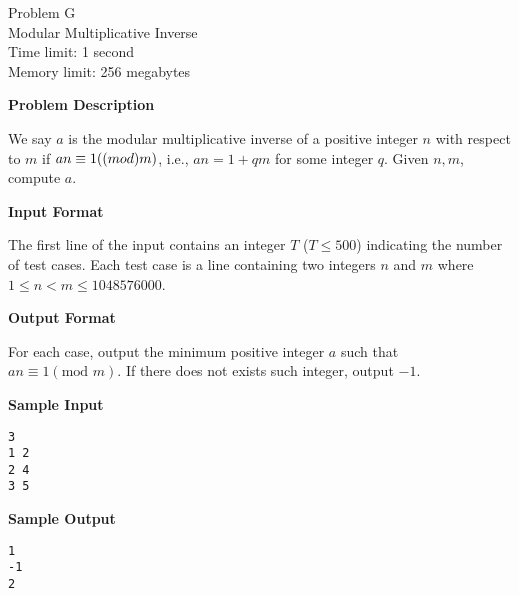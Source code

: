 \documentclass[11pt]{article}
\begin{document}
\begin{center}
    {\LARGE Problem G}\\
    {\Large Modular Multiplicative Inverse}\\
    {Time limit: 1 second}\\
    {Memory limit: 256 megabytes}
\end{center}

\textbf{\large Problem Description}

We say $a$ is the modular multiplicative inverse of a positive integer $n$ 
with respect to $m$ if $an\equiv 1 (\mbox(mod )m)$, i.e., $an=1+qm$ for some
integer $q$. Given $n,m$, compute $a$.

\textbf{\large Input Format}

The first line of the input contains an integer $T$ ($T\le 500$) indicating 
the number of test cases. Each test case is a line containing two integers $n$
and $m$ where $1\le n < m \le 1048576000$.

\textbf{\large Output Format}

For each case, output the minimum positive integer $a$ such that 
$an\equiv 1 (\mbox{mod }m)$. If there does not exists such integer, output
$-1$.

\textbf{\large Sample Input}

\begin{verbatim}
3
1 2
2 4
3 5
\end{verbatim}

\textbf{\large Sample Output}
\begin{verbatim}
1
-1
2
\end{verbatim}
\end{document}
